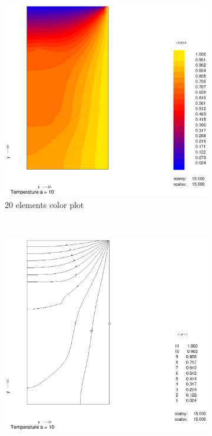\documentclass[10pt,a4paper]{article}
\begin{document}
\begin{figure}[h]
\begin{subfigure}[b]{0.45\textwidth}
                \includegraphics[width=\textwidth]{colplot_a10_20el}
                \caption{20 elements color plot}
                \label{fig:colplot_a10_20el}
        \end{subfigure}
        ~           
        \begin{subfigure}[b]{0.45\textwidth}
                \includegraphics[width=\textwidth]{cont_a10_50el}

\end{subfigure}
\end{figure}
\end{document}
